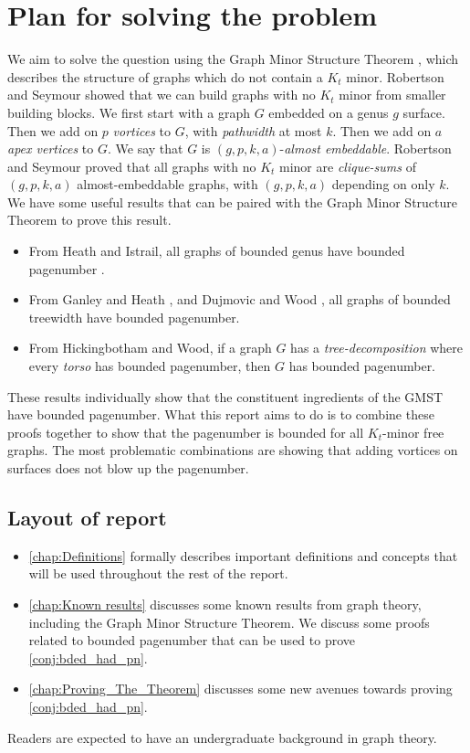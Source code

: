 \section{Plan for solving the problem}
We aim to solve the question using the Graph Minor Structure Theorem \cite{robertsonGraphMinorsXVI2003}, which describes the structure of graphs which do not contain a \(K_t\) minor.
Robertson and Seymour showed that we can build graphs with no \(K_t\) minor from smaller building blocks. We first start with a graph \(G\) embedded on a genus \(g\) surface. Then we add on \(p\) \textit{vortices} to \(G\), with \textit{pathwidth} at most \(k\). Then we add on \(a\) \textit{apex vertices} to \(G\). We say that \(G\) is \((g, p, k, a)\)-\textit{almost embeddable}. Robertson and Seymour \cite{robertsonGraphMinorsXVI2003} proved that all graphs with no \(K_t\) minor are \textit{clique-sums} of \((g, p, k, a)\) almost-embeddable graphs, with \((g, p, k, a)\) depending on only \(k\).
We have some useful results that can be paired with the Graph Minor Structure Theorem to prove this result.
\begin{itemize}
	\item From Heath and Istrail, all graphs of bounded genus have bounded pagenumber \cite{heathPagenumberGenusGraphs1992}.
	\item From Ganley and Heath \cite{ganleyPagenumberTrees2001}, and Dujmovic and Wood \cite{dujmovicGraphTreewidthGeometric2007}, all graphs of bounded treewidth have bounded pagenumber.
	\item From Hickingbotham and Wood\cite{hickingbothamStackNumberCliqueSum2023}, if a graph \(G\) has a \textit{tree-decomposition} where every \textit{torso} has bounded pagenumber, then \(G\) has bounded pagenumber.
\end{itemize}
These results individually show that the constituent ingredients of the GMST have bounded pagenumber. What this report aims to do is to combine these proofs together to show that the pagenumber is bounded for all $K_t$-minor free graphs.
The most problematic combinations are showing that adding vortices on surfaces does not blow up the pagenumber. 
\subsection{Layout of report}
\begin{itemize}
	\item \cref{chap:Definitions} formally describes important definitions and concepts that will be used throughout the rest of the report.
	\item \cref{chap:Known results} discusses some known results from graph theory, including the Graph Minor Structure Theorem. We discuss some proofs related to bounded pagenumber that can be used to prove \cref{conj:bded_had_pn}.

	\item \cref{chap:Proving_The_Theorem} discusses some new avenues towards proving \cref{conj:bded_had_pn}.
\end{itemize}
Readers are expected to have an undergraduate background in graph theory.
